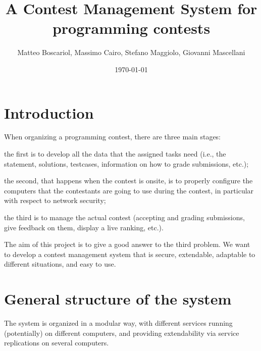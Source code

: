 \documentclass[a4paper,8pt]{amsart}
\title{A Contest Management System for programming contests}
\author{Matteo Boscariol, Massimo Cairo, Stefano Maggiolo, Giovanni
  Mascellani}
\date{\today}
\newenvironment{squishlist}{%
  \begin{list}{\textbullet}%
    { \setlength{\itemsep}{0pt}%
      \setlength{\parsep}{3pt}%
      \setlength{\topsep}{3pt}%
      \setlength{\partopsep}{0pt}%
      \setlength{\leftmargin}{1.5em}%
      \setlength{\labelwidth}{1em}%
      \setlength{\labelsep}{0.5em} }%
}{\end{list}}
\begin{document}
\maketitle
\tableofcontents

\begin{multicols}{2}

  \section{Introduction}

  When organizing a programming contest, there are three main stages:
  \begin{squishlist}
  \item the first is to develop all the data that the assigned tasks
    need (i.e., the statement, solutions, testcases, information on
    how to grade submissions, etc.);
  \item the second, that happens when the contest is onsite, is to
    properly configure the computers that the contestants are going to
    use during the contest, in particular with respect to network
    security;
  \item the third is to manage the actual contest (accepting and
    grading submissions, give feedback on them, display a live
    ranking, etc.).
  \end{squishlist}

  The aim of this project is to give a good answer to the third
  problem. We want to develop a contest management system that is
  secure, extendable, adaptable to different situations, and easy to
  use.

  \section{General structure of the system}

  The system is organized in a modular way, with different services
  running (potentially) on different computers, and providing
  extendability via service replications on several computers.


\end{multicols}
\end{document}
